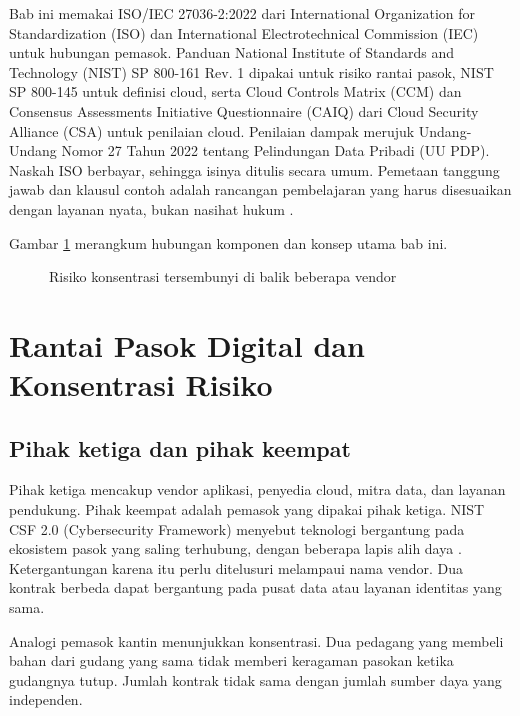Bab ini memakai ISO/IEC 27036-2:2022 dari International Organization for Standardization (ISO)
dan International Electrotechnical Commission (IEC) untuk hubungan pemasok. Panduan National
Institute of Standards and Technology (NIST) SP 800-161 Rev. 1 dipakai untuk risiko rantai
pasok, NIST SP 800-145 untuk definisi cloud, serta Cloud Controls Matrix (CCM) dan Consensus
Assessments Initiative Questionnaire (CAIQ) dari Cloud Security Alliance (CSA) untuk penilaian
cloud. Penilaian dampak merujuk Undang-Undang Nomor 27 Tahun 2022 tentang Pelindungan Data
Pribadi (UU PDP). Naskah ISO berbayar, sehingga isinya ditulis secara umum. Pemetaan tanggung
jawab dan klausul contoh adalah rancangan pembelajaran yang harus disesuaikan dengan layanan
nyata, bukan nasihat hukum
\cite{c09-iso27036,c09-nist-sp800161,c09-nist-sp800145,c09-ccm,uu27-2022-pdp}.

Gambar \ref{fig:ch09-ilustrasi-bab} merangkum hubungan komponen dan konsep utama bab ini.
\begin{figure}[!htb]
  \centering
  
  \caption{Risiko konsentrasi tersembunyi di balik beberapa vendor}
  \label{fig:ch09-ilustrasi-bab}
\end{figure}

\section{Rantai Pasok Digital dan Konsentrasi Risiko}

\subsection*{Pihak ketiga dan pihak keempat}

Pihak ketiga mencakup vendor aplikasi, penyedia cloud, mitra data, dan layanan pendukung. Pihak
keempat adalah pemasok yang dipakai pihak ketiga. NIST CSF 2.0 (Cybersecurity Framework) menyebut
teknologi bergantung pada ekosistem pasok yang saling terhubung, dengan beberapa lapis alih daya
\cite{nistcsf2}. Ketergantungan karena itu perlu ditelusuri melampaui nama vendor. Dua kontrak
berbeda dapat bergantung pada pusat data atau layanan identitas yang sama.

Analogi pemasok kantin menunjukkan konsentrasi. Dua pedagang yang membeli bahan dari gudang yang
sama tidak memberi keragaman pasokan ketika gudangnya tutup. Jumlah kontrak tidak sama dengan
jumlah sumber daya yang independen.

